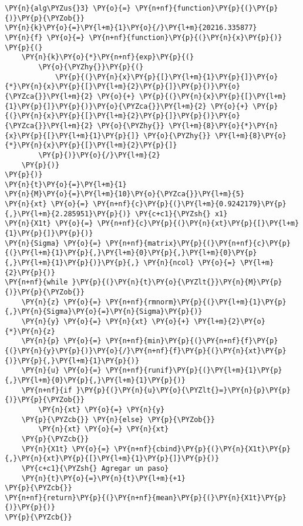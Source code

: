   \begin{tcolorbox}[breakable, size=fbox, boxrule=1pt, pad at break*=1mm,colback=cellbackground, colframe=cellborder]
\begin{Verbatim}[commandchars=\\\{\}]
\PY{n}{alg\PYZus{}3} \PY{o}{=} \PY{n+nf}{function}\PY{p}{(}\PY{p}{)}\PY{p}{\PYZob{}}
\PY{n}{k}\PY{o}{=}\PY{l+m}{1}\PY{o}{/}\PY{l+m}{20216.335877}
\PY{n}{f} \PY{o}{=} \PY{n+nf}{function}\PY{p}{(}\PY{n}{x}\PY{p}{)} \PY{p}{(}
    \PY{n}{k}\PY{o}{*}\PY{n+nf}{exp}\PY{p}{(}
        \PY{o}{\PYZhy{}}\PY{p}{(}
            \PY{p}{(}\PY{n}{x}\PY{p}{[}\PY{l+m}{1}\PY{p}{]}\PY{o}{*}\PY{n}{x}\PY{p}{[}\PY{l+m}{2}\PY{p}{]}\PY{p}{)}\PY{o}{\PYZca{}}\PY{l+m}{2} \PY{o}{+} \PY{p}{(}\PY{n}{x}\PY{p}{[}\PY{l+m}{1}\PY{p}{]}\PY{p}{)}\PY{o}{\PYZca{}}\PY{l+m}{2} \PY{o}{+} \PY{p}{(}\PY{n}{x}\PY{p}{[}\PY{l+m}{2}\PY{p}{]}\PY{p}{)}\PY{o}{\PYZca{}}\PY{l+m}{2} \PY{o}{\PYZhy{}} \PY{l+m}{8}\PY{o}{*}\PY{n}{x}\PY{p}{[}\PY{l+m}{1}\PY{p}{]} \PY{o}{\PYZhy{}} \PY{l+m}{8}\PY{o}{*}\PY{n}{x}\PY{p}{[}\PY{l+m}{2}\PY{p}{]}
        \PY{p}{)}\PY{o}{/}\PY{l+m}{2}
    \PY{p}{)}
\PY{p}{)}
\PY{n}{t}\PY{o}{=}\PY{l+m}{1}
\PY{n}{M}\PY{o}{=}\PY{l+m}{10}\PY{o}{\PYZca{}}\PY{l+m}{5}
\PY{n}{xt} \PY{o}{=} \PY{n+nf}{c}\PY{p}{(}\PY{l+m}{0.9242179}\PY{p}{,}\PY{l+m}{2.285951}\PY{p}{)} \PY{c+c1}{\PYZsh{} x1}
\PY{n}{X1t} \PY{o}{=} \PY{n+nf}{c}\PY{p}{(}\PY{n}{xt}\PY{p}{[}\PY{l+m}{1}\PY{p}{]}\PY{p}{)}
\PY{n}{Sigma} \PY{o}{=} \PY{n+nf}{matrix}\PY{p}{(}\PY{n+nf}{c}\PY{p}{(}\PY{l+m}{1}\PY{p}{,}\PY{l+m}{0}\PY{p}{,}\PY{l+m}{0}\PY{p}{,}\PY{l+m}{1}\PY{p}{)}\PY{p}{,} \PY{n}{ncol} \PY{o}{=} \PY{l+m}{2}\PY{p}{)}
\PY{n+nf}{while }\PY{p}{(}\PY{n}{t}\PY{o}{\PYZlt{}}\PY{n}{M}\PY{p}{)}\PY{p}{\PYZob{}}
    \PY{n}{z} \PY{o}{=} \PY{n+nf}{rmnorm}\PY{p}{(}\PY{l+m}{1}\PY{p}{,}\PY{n}{Sigma}\PY{o}{=}\PY{n}{Sigma}\PY{p}{)}
    \PY{n}{y} \PY{o}{=} \PY{n}{xt} \PY{o}{+} \PY{l+m}{2}\PY{o}{*}\PY{n}{z}
    \PY{n}{p} \PY{o}{=} \PY{n+nf}{min}\PY{p}{(}\PY{n+nf}{f}\PY{p}{(}\PY{n}{y}\PY{p}{)}\PY{o}{/}\PY{n+nf}{f}\PY{p}{(}\PY{n}{xt}\PY{p}{)}\PY{p}{,}\PY{l+m}{1}\PY{p}{)}
    \PY{n}{u} \PY{o}{=} \PY{n+nf}{runif}\PY{p}{(}\PY{l+m}{1}\PY{p}{,}\PY{l+m}{0}\PY{p}{,}\PY{l+m}{1}\PY{p}{)}
    \PY{n+nf}{if }\PY{p}{(}\PY{n}{u}\PY{o}{\PYZlt{}=}\PY{n}{p}\PY{p}{)}\PY{p}{\PYZob{}}
        \PY{n}{xt} \PY{o}{=} \PY{n}{y}
    \PY{p}{\PYZcb{}} \PY{n}{else} \PY{p}{\PYZob{}}
        \PY{n}{xt} \PY{o}{=} \PY{n}{xt}
    \PY{p}{\PYZcb{}}
    \PY{n}{X1t} \PY{o}{=} \PY{n+nf}{cbind}\PY{p}{(}\PY{n}{X1t}\PY{p}{,}\PY{n}{xt}\PY{p}{[}\PY{l+m}{1}\PY{p}{]}\PY{p}{)}
    \PY{c+c1}{\PYZsh{} Agregar un paso}
    \PY{n}{t}\PY{o}{=}\PY{n}{t}\PY{l+m}{+1}
\PY{p}{\PYZcb{}}
\PY{n+nf}{return}\PY{p}{(}\PY{n+nf}{mean}\PY{p}{(}\PY{n}{X1t}\PY{p}{)}\PY{p}{)}
\PY{p}{\PYZcb{}}
\end{Verbatim}
\end{tcolorbox}
